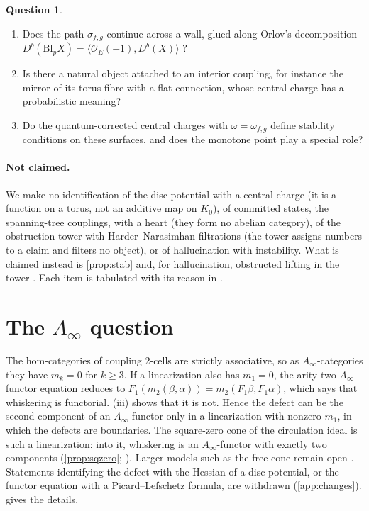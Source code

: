 \documentclass[11pt]{article}
\theoremstyle{definition}
\newtheorem{question}[theorem]{Question}
\theoremstyle{remark}
\begin{document}
\begin{question}\label{q:stab}
\leavevmode
\begin{enumerate}[label=(\roman*),leftmargin=*]
\item Does the path $\sigma_{f,g}$ continue across a wall, glued along Orlov's decomposition
  $D^b(\mathrm{Bl}_pX)=\langle\mathcal O_E(-1),D^b(X)\rangle$ \cite{Orlov1992}?
\item Is there a natural object attached to an interior coupling, for instance the mirror of its torus
  fibre with a flat connection, whose central charge has a probabilistic meaning?
\item Do the quantum-corrected central charges with $\omega=\omega_{f,g}$ define stability conditions on these
  surfaces, and does the monotone point play a special role?
\end{enumerate}
\end{question}

\paragraph{Not claimed.} We make no identification of the disc potential with a central charge (it is a
function on a torus, not an additive map on $K_0$), of committed states, the spanning-tree couplings, with a heart (they
form no abelian category), of the obstruction tower with Harder--Narasimhan filtrations (the tower assigns numbers to a
claim and filters no object), or of hallucination with instability. What is claimed instead is \cref{prop:stab} and,
for hallucination, obstructed lifting in the tower \cite[\S11]{Conditionals}. Each item is tabulated with its
reason in \cite[App.~A]{Conditionals}.

\section{The $A_\infty$ question}\label{sec:ainfty}

The hom-categories of coupling 2-cells are strictly associative, so as $A_\infty$-categories they have
$m_k=0$ for $k\ge3$. If a linearization also has $m_1=0$, the arity-two $A_\infty$-functor equation reduces to
$F_1(m_2(\beta,\alpha))=m_2(F_1\beta,F_1\alpha)$, which says that whiskering is functorial. (iii)
shows that it is not. Hence the defect can be the second component of an $A_\infty$-functor only in a
linearization with nonzero $m_1$, in which the defects are boundaries. The square-zero cone of the circulation
ideal is such a linearization: into it, whiskering is an $A_\infty$-functor with exactly two components
(\cref{prop:sqzero}; \cite[Thm.~5.2]{Conditionals}). Larger models such as the free cone remain open
\cite[Question~9.4]{Conditionals}. Statements identifying the defect with the Hessian of a disc potential, or the
functor equation with a Picard--Lefschetz formula, are withdrawn (\cref{app:changes}).  gives
the details.
\end{document}
